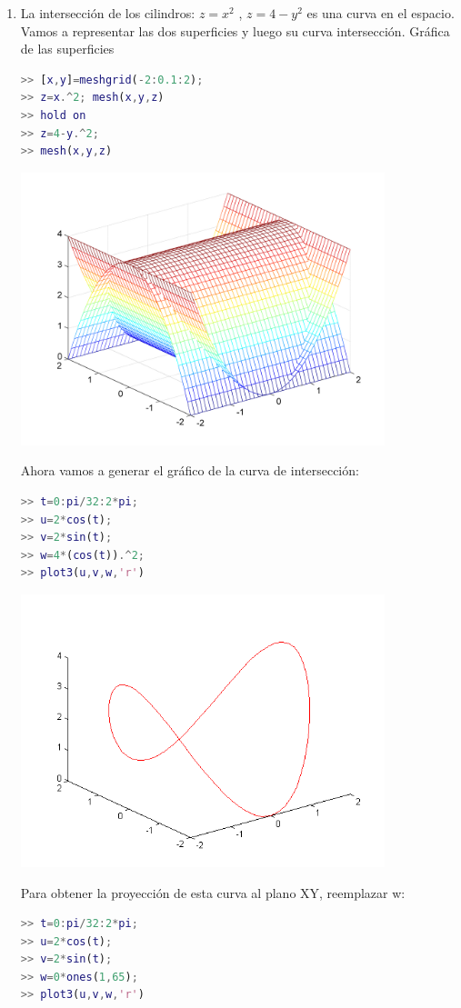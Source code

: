 \begin{enumerate}
\item La intersección de los cilindros: $z=x^{2}$ , $z=4-y^{2}$ es una curva en el espacio. Vamos a representar las dos superficies y luego su curva intersección. Gráfica de las superficies 

\begin{lstlisting}[language=Matlab]
>> [x,y]=meshgrid(-2:0.1:2); 
>> z=x.^2; mesh(x,y,z) 
>> hold on 
>> z=4-y.^2;
>> mesh(x,y,z)
\end{lstlisting}
\includegraphics[width=300pt]{./Imagenes/superficies1.png}


Ahora vamos a generar el gráfico de la curva de intersección:
\begin{lstlisting}[language=Matlab]
>> t=0:pi/32:2*pi;
>> u=2*cos(t);
>> v=2*sin(t);
>> w=4*(cos(t)).^2;
>> plot3(u,v,w,'r')
\end{lstlisting}
\includegraphics[width=300pt]{./Imagenes/superficies2.png}

Para obtener la proyección de esta curva al plano XY, reemplazar w: 
\begin{lstlisting}[language=Matlab]
>> t=0:pi/32:2*pi;
>> u=2*cos(t);
>> v=2*sin(t);
>> w=0*ones(1,65);
>> plot3(u,v,w,'r')
\end{lstlisting}


\end{enumerate}
